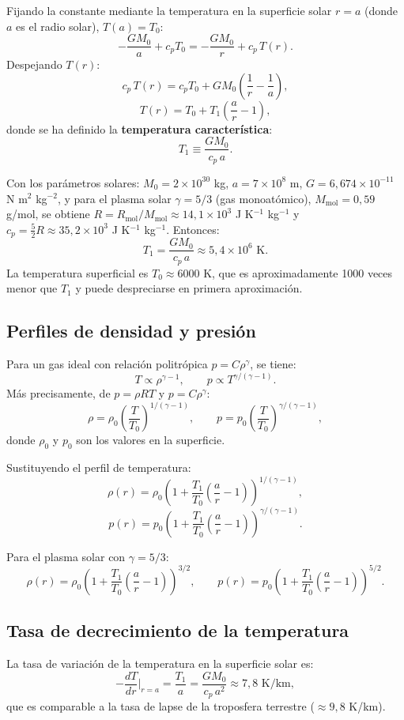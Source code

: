 Fijando la constante mediante la temperatura en la superficie solar $r = a$ (donde $a$ es el radio solar), $T(a) = T_0$:
$$
-\frac{GM_0}{a} + c_p T_0 = -\frac{GM_0}{r} + c_p\,T(r).
$$
Despejando $T(r)$:
$$
c_p\,T(r) = c_p T_0 + GM_0\left(\frac{1}{r} - \frac{1}{a}\right),
$$
$$
\boxed{T(r) = T_0 + T_1\left(\frac{a}{r} - 1\right),}
$$
donde se ha definido la \textbf{temperatura característica}:
$$
T_1 \equiv \frac{GM_0}{c_p\,a}.
$$

Con los parámetros solares: $M_0 = 2\times 10^{30}$ kg, $a = 7\times 10^8$ m, $G = 6{,}674\times 10^{-11}$ N m$^2$ kg$^{-2}$, y para el plasma solar $\gamma = 5/3$ (gas monoatómico), $M_{\text{mol}} = 0{,}59$ g/mol, se obtiene $R = R_{\text{mol}}/M_{\text{mol}} \approx 14{,}1\times10^3$ J K$^{-1}$ kg$^{-1}$ y $c_p = \frac{5}{2}R \approx 35{,}2\times10^3$ J K$^{-1}$ kg$^{-1}$. Entonces:
$$
T_1 = \frac{GM_0}{c_p\,a} \approx 5{,}4\times 10^6 \text{ K}.
$$
La temperatura superficial es $T_0 \approx 6000$ K, que es aproximadamente 1000 veces menor que $T_1$ y puede despreciarse en primera aproximación.

\subsection{Perfiles de densidad y presión}

Para un gas ideal con relación politrópica $p = C\rho^{\gamma}$, se tiene:
$$
T \propto \rho^{\gamma - 1}, \qquad p \propto T^{\gamma/(\gamma-1)}.
$$
Más precisamente, de $p = \rho R T$ y $p = C\rho^{\gamma}$:
$$
\rho = \rho_0\left(\frac{T}{T_0}\right)^{1/(\gamma-1)}, \qquad p = p_0\left(\frac{T}{T_0}\right)^{\gamma/(\gamma-1)},
$$
donde $\rho_0$ y $p_0$ son los valores en la superficie.

Sustituyendo el perfil de temperatura:
$$
\boxed{\rho(r) = \rho_0\left(1 + \frac{T_1}{T_0}\left(\frac{a}{r}-1\right)\right)^{1/(\gamma-1)},}
$$
$$
\boxed{p(r) = p_0\left(1 + \frac{T_1}{T_0}\left(\frac{a}{r}-1\right)\right)^{\gamma/(\gamma-1)}.}
$$

Para el plasma solar con $\gamma = 5/3$:
$$
\rho(r) = \rho_0\left(1 + \frac{T_1}{T_0}\left(\frac{a}{r}-1\right)\right)^{3/2}, \qquad p(r) = p_0\left(1 + \frac{T_1}{T_0}\left(\frac{a}{r}-1\right)\right)^{5/2}.
$$

\subsection{Tasa de decrecimiento de la temperatura}

La tasa de variación de la temperatura en la superficie solar es:
$$
-\frac{dT}{dr}\bigg|_{r=a} = \frac{T_1}{a} = \frac{GM_0}{c_p\,a^2} \approx 7{,}8 \text{ K/km},
$$
que es comparable a la tasa de lapse de la troposfera terrestre ($\approx 9{,}8$ K/km).

